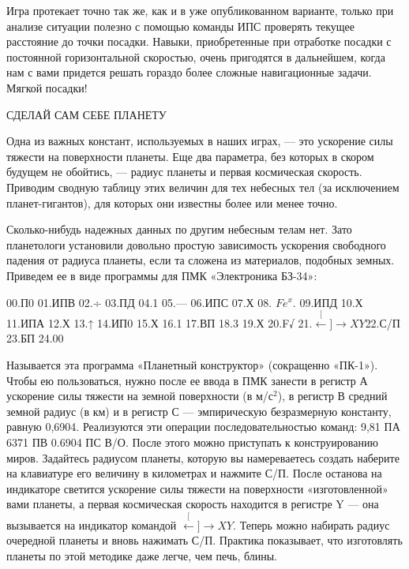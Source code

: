 \documentclass[11pt,a4paper,oneside]{article}
\def\XY{$\stackrel[\leftarrow]{\rightarrow}{XY}$}
\begin{document}
Игра протекает точно так же, как и в уже опубликованном варианте, только при анализе ситуации полезно с помощью команды ИПС проверять текущее расстояние до точки посадки. Навыки, приобретенные при отработке посадки с постоянной горизонтальной скоростью, очень пригодятся в дальнейшем, когда нам с вами придется решать гораздо более сложные навигационные задачи. Мягкой посадки!

СДЕЛАЙ САМ СЕБЕ ПЛАНЕТУ

Одна из важных констант, используемых в наших играх, — это ускорение силы тяжести на поверхности планеты. Еще два параметра, без которых в скором будущем не обойтись, — радиус планеты и первая космическая скорость. Приводим сводную таблицу этих величин для тех небесных тел (за исключением планет-гигантов), для которых они известны более или менее точно.

Сколько-нибудь надежных данных по другим небесным телам нет. Зато планетологи установили довольно простую зависимость ускорения свободного падения от радиуса планеты, если та сложена из материалов, подобных земных. Приведем ее в виде программы для ПМК «Электроника БЗ-34»:

00.П0 01.ИПВ 02.÷ 03.ПД 04.1 05.— 06.ИПС 07.Х 08. $Fe^{x}$. 09.ИПД 10.Х
11.ИПА 12.Х 13.↑ 14.ИП0 15.Х 16.1 17.ВП 18.3 19.Х 20.F√ 21.\XY 22.С/П 23.БП 24.00

Называется эта программа «Планетный конструктор» (сокращенно «ПК-1»). Чтобы ею пользоваться, нужно после ее ввода в ПМК занести в регистр А ускорение силы тяжести на земной поверхности (в м/с$^{2}$), в регистр В средний земной радиус (в км) и в регистр С — эмпирическую безразмерную константу, равную 0,6904. Реализуются эти операции	последовательностью команд: 9,81 ПА 6371 ПВ 0.6904 ПС В/О. После этого можно приступать к конструированию миров. Задайтесь радиусом планеты, которую вы намереваетесь создать наберите на клавиатуре его величину в километрах и нажмите С/П. После останова на индикаторе светится ускорение силы тяжести на поверхности «изготовленной» вами планеты, а первая космическая скорость находится в регистре Y — она вызывается на индикатор командой \XY. Теперь можно набирать радиус очередной планеты и вновь нажимать С/П. Практика показывает, что изготовлять планеты по этой методике даже легче, чем печь, блины.
\end{document}
